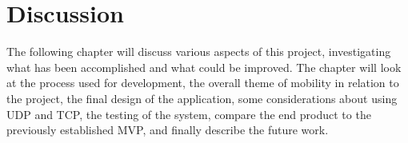 \chapter{Discussion}
The following chapter will discuss various aspects of this project, investigating what has been accomplished and what could be improved.
The chapter will look at the process used for development, the overall theme of mobility in relation to the project, the final design of the application, some considerations about using UDP and TCP, the testing of the system, compare the end product to the previously established MVP, and finally describe the future work.








